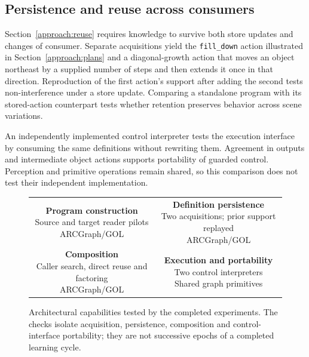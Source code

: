 \documentclass[11pt]{article}
\begin{document}
\subsection{Persistence and reuse across consumers}\label{design:persistence}\label{design:external-control}
Section~\ref{approach:reuse} requires knowledge to survive both store updates and changes of consumer. Separate acquisitions yield the \texttt{fill\_down} action illustrated in Section~\ref{approach:plans} and a diagonal-growth action that moves an object northeast by a supplied number of steps and then extends it once in that direction. Reproduction of the first action's support after adding the second tests non-interference under a store update. Comparing a standalone program with its stored-action counterpart tests whether retention preserves behavior across scene variations.

An independently implemented control interpreter tests the execution interface by consuming the same definitions without rewriting them. Agreement in outputs and intermediate object actions supports portability of guarded control. Perception and primitive operations remain shared, so this comparison does not test their independent implementation.

\begin{figure}[htbp]
\centering
\setlength{\tabcolsep}{4pt}
\begin{tabular}{cc}
\fbox{\parbox[c][1.6cm][c]{0.40\linewidth}{\centering
\textbf{Program construction}\\Source and target reader pilots\\\small ARCGraph/GOL}} &
\fbox{\parbox[c][1.6cm][c]{0.40\linewidth}{\centering
\textbf{Definition persistence}\\Two acquisitions; prior support replayed\\\small ARCGraph/GOL}} \\[8pt]
\fbox{\parbox[c][1.6cm][c]{0.40\linewidth}{\centering
\textbf{Composition}\\Caller search, direct reuse and factoring\\\small ARCGraph/GOL}} &
\fbox{\parbox[c][1.6cm][c]{0.40\linewidth}{\centering
\textbf{Execution and portability}\\Two control interpreters\\\small Shared graph primitives}} \\
\end{tabular}
\caption{Architectural capabilities tested by the completed experiments. The checks isolate acquisition, persistence, composition and control-interface portability; they are not successive epochs of a completed learning cycle.}
\label{fig:evidence-coverage}
\end{figure}
\end{document}

